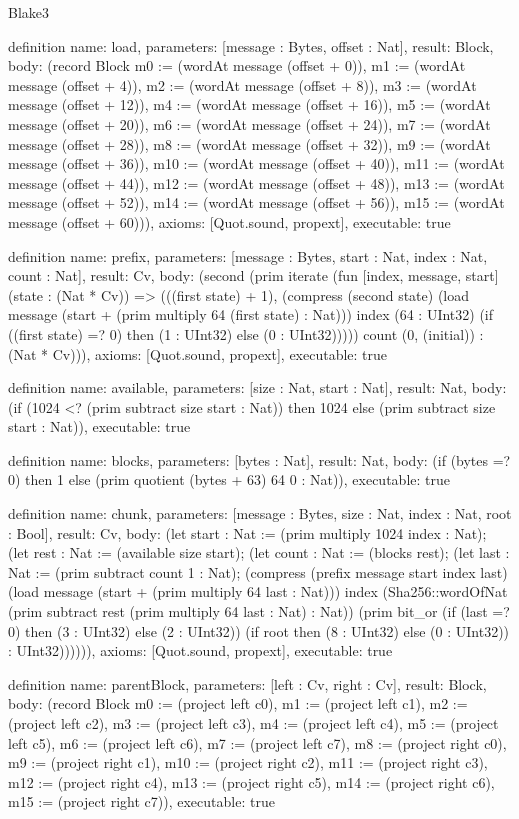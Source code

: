 \begin{lexlean}{Blake3}
\begin{semanticmodule}
definition{
  name: load,
  parameters: [message : Bytes, offset : Nat],
  result: Block,
  body: (record Block {m0 := (wordAt message (offset + 0)), m1 := (wordAt message (offset + 4)), m2 := (wordAt message (offset + 8)), m3 := (wordAt message (offset + 12)), m4 := (wordAt message (offset + 16)), m5 := (wordAt message (offset + 20)), m6 := (wordAt message (offset + 24)), m7 := (wordAt message (offset + 28)), m8 := (wordAt message (offset + 32)), m9 := (wordAt message (offset + 36)), m10 := (wordAt message (offset + 40)), m11 := (wordAt message (offset + 44)), m12 := (wordAt message (offset + 48)), m13 := (wordAt message (offset + 52)), m14 := (wordAt message (offset + 56)), m15 := (wordAt message (offset + 60))}),
  axioms: [Quot.sound, propext],
  executable: true
}

definition{
  name: prefix,
  parameters: [message : Bytes, start : Nat, index : Nat, count : Nat],
  result: Cv,
  body: (second (prim iterate (fun [index, message, start] (state : (Nat * Cv)) => (((first state) + 1), (compress (second state) (load message (start + (prim multiply 64 (first state) : Nat))) index (64 : UInt32) (if ((first state) =? 0) then (1 : UInt32) else (0 : UInt32))))) count (0, (initial)) : (Nat * Cv))),
  axioms: [Quot.sound, propext],
  executable: true
}

definition{
  name: available,
  parameters: [size : Nat, start : Nat],
  result: Nat,
  body: (if (1024 <? (prim subtract size start : Nat)) then 1024 else (prim subtract size start : Nat)),
  executable: true
}

definition{
  name: blocks,
  parameters: [bytes : Nat],
  result: Nat,
  body: (if (bytes =? 0) then 1 else (prim quotient (bytes + 63) 64 0 : Nat)),
  executable: true
}

definition{
  name: chunk,
  parameters: [message : Bytes, size : Nat, index : Nat, root : Bool],
  result: Cv,
  body: (let start : Nat := (prim multiply 1024 index : Nat); (let rest : Nat := (available size start); (let count : Nat := (blocks rest); (let last : Nat := (prim subtract count 1 : Nat); (compress (prefix message start index last) (load message (start + (prim multiply 64 last : Nat))) index (Sha256::wordOfNat (prim subtract rest (prim multiply 64 last : Nat) : Nat)) (prim bit_or (if (last =? 0) then (3 : UInt32) else (2 : UInt32)) (if root then (8 : UInt32) else (0 : UInt32)) : UInt32)))))),
  axioms: [Quot.sound, propext],
  executable: true
}

definition{
  name: parentBlock,
  parameters: [left : Cv, right : Cv],
  result: Block,
  body: (record Block {m0 := (project left c0), m1 := (project left c1), m2 := (project left c2), m3 := (project left c3), m4 := (project left c4), m5 := (project left c5), m6 := (project left c6), m7 := (project left c7), m8 := (project right c0), m9 := (project right c1), m10 := (project right c2), m11 := (project right c3), m12 := (project right c4), m13 := (project right c5), m14 := (project right c6), m15 := (project right c7)}),
  executable: true
}


\end{semanticmodule}
\end{lexlean}
